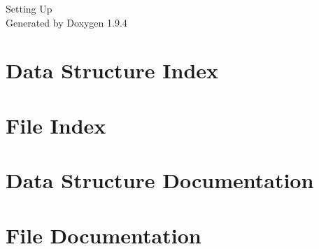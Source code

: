 \documentclass[twoside]{book}
\newcommand{\+}{\discretionary{\mbox{\scriptsize$\hookleftarrow$}}{}{}}
\newcommand{\clearemptydoublepage}{%
    \newpage{\pagestyle{empty}\cleardoublepage}%
  }
\begin{document}
  \raggedbottom
    \hypersetup{pageanchor=false,
                bookmarksnumbered=true,
                pdfencoding=unicode
               }
  \begin{titlepage}
  \vspace*{7cm}
  \begin{center}%
  {\Large Setting Up}\\
  \vspace*{1cm}
  {\large Generated by Doxygen 1.9.4}\\
  \end{center}
  \end{titlepage}
  \clearemptydoublepage
  \tableofcontents
  \clearemptydoublepage
  \hypersetup{pageanchor=true}
\chapter{Data Structure Index}

\chapter{File Index}

\chapter{Data Structure Documentation}

\chapter{File Documentation}







  \backmatter
  \newpage
  \clearemptydoublepage
  \printindex
\end{document}
